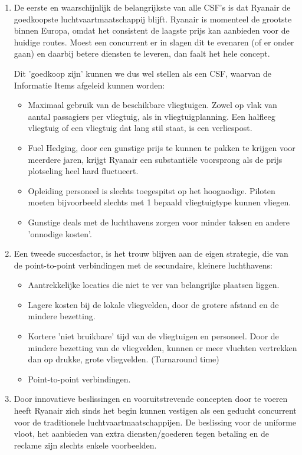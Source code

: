 \documentclass{article}
\begin{document}
\begin{enumerate}
\item De eerste en waarschijnlijk de belangrijkste van alle CSF's is dat Ryanair de goedkoopste luchtvaartmaatschappij blijft. Ryanair is momenteel de grootste binnen Europa, omdat het consistent de laagste prijs kan aanbieden voor de huidige routes. Moest een concurrent er in slagen dit te evenaren (of er onder gaan) en daarbij betere diensten te leveren, dan faalt het hele concept. 

Dit 'goedkoop zijn' kunnen we dus wel stellen als een CSF, waarvan de Informatie Items afgeleid kunnen worden:

\begin{itemize}
\item Maximaal gebruik van de beschikbare vliegtuigen. Zowel op vlak van aantal passagiers per vliegtuig, als in vliegtuigplanning. Een halfleeg vliegtuig of een vliegtuig dat lang stil staat, is een verliespost.
\item Fuel Hedging, door een gunstige prijs te kunnen te pakken te krijgen voor meerdere jaren, krijgt Ryanair een substanti\"ele voorsprong als de prijs plotseling heel hard fluctueert.
\item Opleiding personeel is slechts toegespitst op het hoognodige. Piloten moeten bijvoorbeeld slechts met 1 bepaald vliegtuigtype kunnen vliegen.
\item Gunstige deals met de luchthavens zorgen voor minder taksen en andere 'onnodige kosten'.
\end{itemize}

\item Een tweede succesfactor, is het trouw blijven aan de eigen strategie, die van de point-to-point verbindingen met de secundaire, kleinere luchthavens:

\begin{itemize}
\item Aantrekkelijke locaties die niet te ver van belangrijke plaatsen liggen.
\item Lagere kosten bij de lokale vliegvelden, door de grotere afstand en de mindere bezetting.
\item Kortere 'niet bruikbare' tijd van de vliegtuigen en personeel. Door de mindere bezetting van de vliegvelden, kunnen er meer vluchten vertrekken dan op drukke, grote vliegvelden. (Turnaround time)
\item Point-to-point verbindingen.
\end{itemize}

\item Door innovatieve beslissingen en vooruitstrevende concepten door te voeren heeft Ryanair zich sinds het begin kunnen vestigen als een geducht concurrent voor de traditionele luchtvaartmaatschappijen. De beslissing voor de uniforme vloot, het aanbieden van extra diensten/goederen tegen betaling en de reclame zijn slechts enkele voorbeelden.


\end{enumerate}
\end{document}
